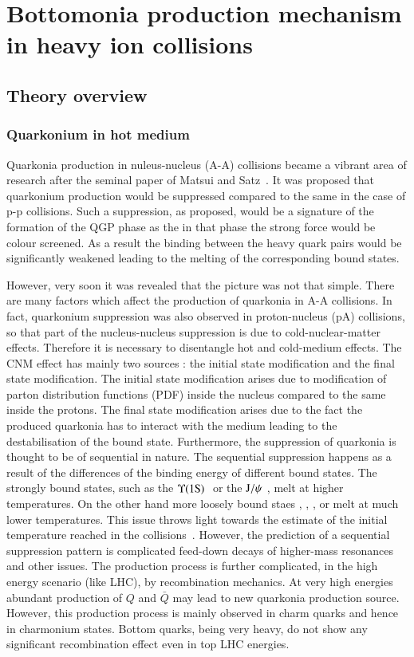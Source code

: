 \section{Bottomonia production mechanism in heavy ion collisions}
\label{sec:Bottomonia_hi}

\subsection{Theory overview}
\subsubsection{Quarkonium in hot medium}
\label{sec:media_sec3}

 Quarkonia production in nuleus-nucleus (A-A) collisions  became a vibrant area of research after the seminal 
paper of Matsui and Satz~\cite{Matsui:1986dk}. It was proposed that quarkonium production would be suppressed
compared to the same in the case of p-p collisions.  Such a suppression, as proposed, would be a signature of 
the formation of the QGP phase as the in that phase the strong force would be colour screened. As a result 
the binding between the heavy quark pairs would be significantly weakened leading to the melting of the corresponding 
bound states. 

However, very soon it was revealed that the picture was not that simple. There are many factors which affect the 
production of quarkonia in A-A collisions. 
In fact, quarkonium suppression was also observed in proton-nucleus (pA)
collisions, so that part of the nucleus-nucleus suppression is due to 
cold-nuclear-matter effects. Therefore it is necessary to disentangle hot 
and cold-medium effects. The CNM effect has mainly two sources : the initial state modification and the 
final state modification. The initial state modification arises due to modification of parton distribution 
functions (PDF) inside the nucleus compared to the same inside the protons. The final state modification 
arises due to the  fact the produced quarkonia has to interact with the medium leading to the destabilisation
of the bound state. Furthermore, the suppression of quarkonia is thought to be of sequential in nature.  
The sequential suppression happens as a result of the differences of the  binding energy of different bound states. 
The strongly bound states, such as the $\Upsilon\mathrm{(1S)}\hspace {0.05in}$ or the $\mathrm{J}/\psi\hspace {0.05in}$,  melt at higher 
temperatures. On the other hand  more loosely bound staes \psiP, \chic, \chib, 
\upsb or \upsc  melt at much lower temperatures.  This issue throws light towards the 
 estimate of the initial temperature reached in 
the collisions~\cite{Digal:2001ue}. However, the prediction of a sequential 
suppression pattern is complicated feed-down 
decays of higher-mass resonances and other issues. The production process is further 
complicated, in the high energy scenario (like LHC), by recombination mechanics. At very 
high energies abundant production of $Q$ and $\bar Q$ may lead to new quarkonia production 
source. However, this production process is mainly observed in charm quarks and hence in charmonium 
states. Bottom quarks, being very heavy, do not show any significant recombination effect even in top 
LHC energies.   

